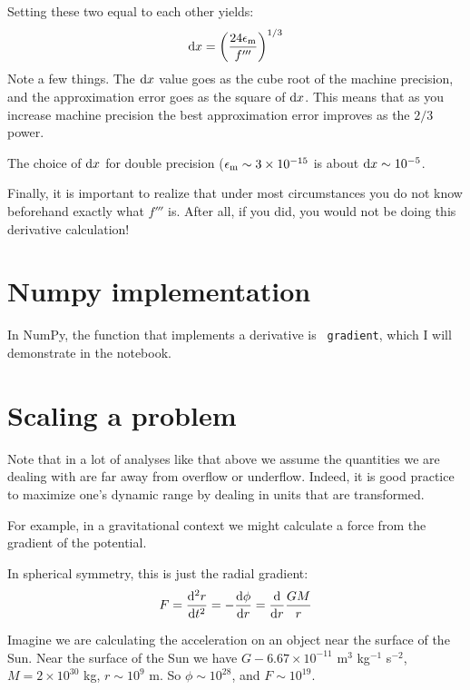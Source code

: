 Setting these two equal to each other yields:
\begin{equation}
{\rm d}x = \left(\frac{24 \epsilon_{\rm m}}{f'''}\right)^{1/3}
\end{equation}
Note a few things. The ${\rm d}x$ value goes as the cube root of the
machine precision, and the approximation error goes as the square of
${\rm d}x$. This means that as you increase machine precision the best
approximation error improves as the $2/3$ power.

The choice of ${\rm d}x$ for double precision ($\epsilon_{\rm m} \sim
3\times 10^{-15}$ is about ${\rm d}x \sim 10^{-5}$.

Finally, it is important to realize that under most circumstances you
do not know beforehand exactly what $f'''$ is. After all, if you did,
you would not be doing this derivative calculation!

\section{Numpy implementation}

In NumPy, the function that implements a derivative is {\tt
  gradient}, which I will demonstrate in the notebook. 

\section{Scaling a problem}

Note that in a lot of analyses like that above we assume the
quantities we are dealing with are far away from overflow or
underflow. Indeed, it is good practice to maximize one's dynamic range
by dealing in units that are transformed. 

For example, in a gravitational context we might calculate a force
from the gradient of the potential.


\begin{answer}
In spherical symmetry, this is
just the radial gradient:
\begin{equation}
F = \frac{{\rm d}^2r}{{\rm d}t^2} = - \frac{{\rm d}\phi}{{\rm d}r} =
\frac{{\rm d}}{{\rm d}r} \frac{GM}{r}
\end{equation}
\end{answer}

Imagine we are calculating the acceleration on an object near the
surface of the Sun.  Near the surface of the Sun we have $G - 6.67
\times 10^{-11}$ m$^3$ kg$^{-1}$ s$^{-2}$, $M= 2\times 10^{30}$ kg, $r
\sim 10^9$ m. So $\phi \sim 10^{28}$, and $F\sim 10^{19}$.

